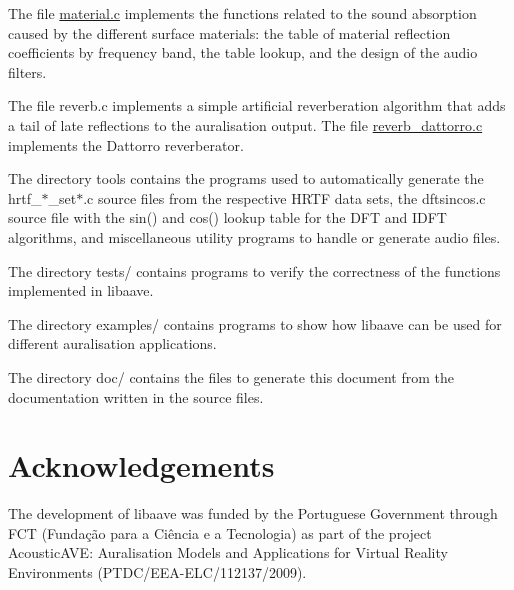 The file \hyperlink{material_8c}{material.\-c} implements the functions related to the sound absorption caused by the different surface materials\-: the table of material reflection coefficients by frequency band, the table lookup, and the design of the audio filters.

The file reverb.\-c implements a simple artificial reverberation algorithm that adds a tail of late reflections to the auralisation output. The file \hyperlink{reverb__dattorro_8c}{reverb\-\_\-dattorro.\-c} implements the Dattorro reverberator.

The directory tools contains the programs used to automatically generate the hrtf\-\_\-$\ast$\-\_\-set$\ast$.c source files from the respective H\-R\-T\-F data sets, the dftsincos.\-c source file with the sin() and cos() lookup table for the D\-F\-T and I\-D\-F\-T algorithms, and miscellaneous utility programs to handle or generate audio files.

The directory tests/ contains programs to verify the correctness of the functions implemented in libaave.

The directory examples/ contains programs to show how libaave can be used for different auralisation applications.

The directory doc/ contains the files to generate this document from the documentation written in the source files.\hypertarget{index_acknowledgements}{}\section{Acknowledgements}\label{index_acknowledgements}
The development of libaave was funded by the Portuguese Government through F\-C\-T (Fundação para a Ciência e a Tecnologia) as part of the project Acoustic\-A\-V\-E\-: Auralisation Models and Applications for Virtual Reality Environments (P\-T\-D\-C/\-E\-E\-A-\/\-E\-L\-C/112137/2009). 